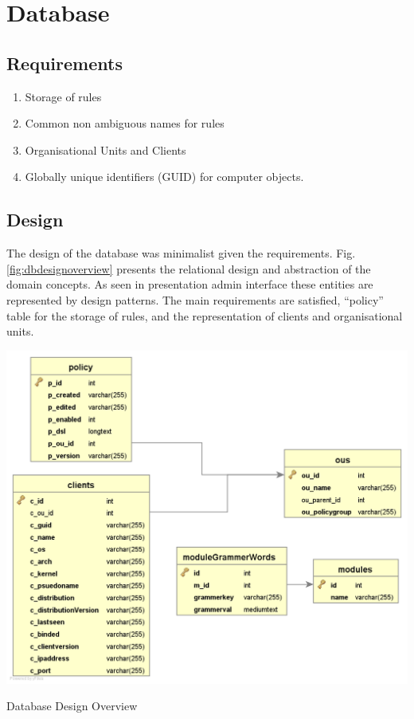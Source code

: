 \newpage

\section{Database} 

	\subsection{Requirements}
	
		\normalsize
		{		
			\begin{enumerate}[itemsep=1pt,parsep=1pt]
				\item Storage of rules
				\item Common non ambiguous names for rules
				\item Organisational Units and Clients
				\item Globally unique identifiers (GUID) for computer objects. 
			\end{enumerate} 		
		}
	
	\subsection{Design}	

		\normalsize
		{
			The design of the database was minimalist given the requirements.
			Fig. \ref{fig:dbdesignoverview} presents the relational design and
			abstraction of the domain concepts.  As seen in presentation admin 
			interface these entities are represented by design patterns.
			The main requirements are satisfied, ``policy'' table for the storage of rules,
			and the representation of clients and organisational units. 	
			\newline			
		}
	
		\begin{figurehere}
			\begin{center}
			\includegraphics[scale=0.35]{pages/chapter3/figures/db.png}
			\end{center}
			\caption{Database Design Overview}
			\label{fig:dbdesignoverview}
		\end{figurehere}	
	
